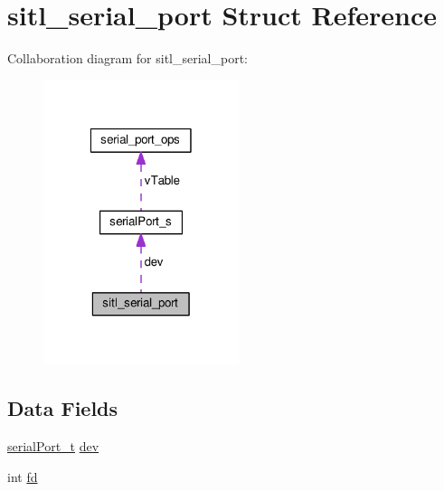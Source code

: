 \hypertarget{structsitl__serial__port}{\section{sitl\+\_\+serial\+\_\+port Struct Reference}
\label{structsitl__serial__port}
}


Collaboration diagram for sitl\+\_\+serial\+\_\+port\+:\nopagebreak
\begin{figure}[H]
\begin{center}
\leavevmode
\includegraphics[width=162pt]{structsitl__serial__port__coll__graph}
\end{center}
\end{figure}
\subsection*{Data Fields}
\begin{DoxyCompactItemize}
\item 
\hyperlink{drivers_2serial_8h_a64a5e2f04e1a908fbb1b3b165f88e0ef}{serial\+Port\+\_\+t} \hyperlink{structsitl__serial__port_a864b43d6af43ceabb6d9ce88c0ec369e}{dev}
\item 
int \hyperlink{structsitl__serial__port_a6359b0a0389d0352e566b93f6b2b6c59}{fd}
\end{DoxyCompactItemize}


